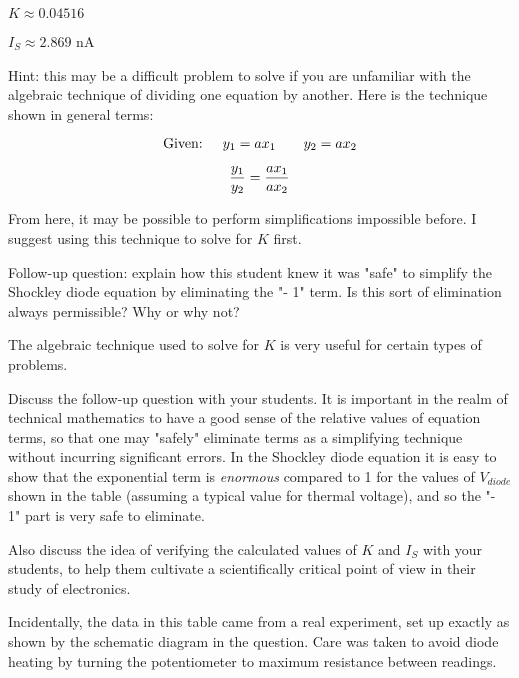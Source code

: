 





$K \approx 0.04516$

$I_S \approx 2.869$ nA

\vskip 10pt

Hint: this may be a difficult problem to solve if you are unfamiliar with the algebraic technique of dividing one equation by another.  Here is the technique shown in general terms:

$$\hbox{Given: \hskip 10pt} y_1 = ax_1 \hbox{\hskip 20pt} y_2 = ax_2$$

$${y_1 \over y_2} = {ax_1 \over ax_2}$$

From here, it may be possible to perform simplifications impossible before.  I suggest using this technique to solve for $K$ first.

\vskip 10pt

Follow-up question: explain how this student knew it was "safe" to simplify the Shockley diode equation by eliminating the "- 1" term.  Is this sort of elimination always permissible?  Why or why not?







The algebraic technique used to solve for $K$ is very useful for certain types of problems.

Discuss the follow-up question with your students.  It is important in the realm of technical mathematics to have a good sense of the relative values of equation terms, so that one may "safely" eliminate terms as a simplifying technique without incurring significant errors.  In the Shockley diode equation it is easy to show that the exponential term is {\it enormous} compared to 1 for the values of $V_{diode}$ shown in the table (assuming a typical value for thermal voltage), and so the "- 1" part is very safe to eliminate. 

Also discuss the idea of verifying the calculated values of $K$ and $I_S$ with your students, to help them cultivate a scientifically critical point of view in their study of electronics.

\vskip 10pt

Incidentally, the data in this table came from a real experiment, set up exactly as shown by the schematic diagram in the question.  Care was taken to avoid diode heating by turning the potentiometer to maximum resistance between readings.




